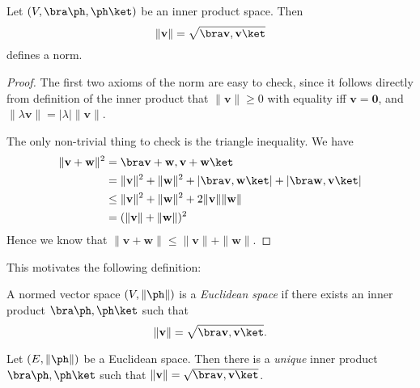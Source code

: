 \documentclass[a4paper]{article}
\begin{document}
\begin{prop}
  Let $(V, \bra \ph, \ph\ket)$ be an inner product space. Then
  \[
    \|\mathbf{v}\| = \sqrt{\bra \mathbf{v}, \mathbf{v}\ket}
  \]
  defines a norm.
\end{prop}

\begin{proof}
  The first two axioms of the norm are easy to check, since it follows directly from definition of the inner product that $\|\mathbf{v}\| \geq 0$ with equality iff $\mathbf{v} = \mathbf{0}$, and $\|\lambda \mathbf{v}\| = |\lambda| \|\mathbf{v}\|$.

  The only non-trivial thing to check is the triangle inequality. We have
  \begin{align*}
    \|\mathbf{v} + \mathbf{w}\|^2 &= \bra \mathbf{v} + \mathbf{w}, \mathbf{v} + \mathbf{w}\ket\\
    &= \|\mathbf{v}\|^2 + \|\mathbf{w}\|^2 + |\bra \mathbf{v}, \mathbf{w}\ket| + |\bra \mathbf{w}, \mathbf{v}\ket|\\
    &\leq \|\mathbf{v}\|^2 + \|\mathbf{w}\|^2 + 2\|\mathbf{v}\|\|\mathbf{w}\| \\
    &= (\|\mathbf{v}\| + \|\mathbf{w}\|)^2
  \end{align*}
  Hence we know that $\|\mathbf{v} + \mathbf{w}\| \leq \|\mathbf{v} \| + \|\mathbf{w}\|$.
\end{proof}

This motivates the following definition:
\begin{defi}
  A normed vector space $(V, \|\ph\|)$ is a \emph{Euclidean space} if there exists an inner product $\bra \ph,\ph\ket$ such that
  \[
    \|\mathbf{v}\| = \sqrt{\bra \mathbf{v}, \mathbf{v}\ket}.
  \]
\end{defi}

\begin{prop}
  Let $(E, \|\ph\|)$ be a Euclidean space. Then there is a \emph{unique} inner product $\bra \ph,\ph\ket$ such that $\|\mathbf{v}\| = \sqrt{\bra \mathbf{v}, \mathbf{v}\ket}$.
\end{prop}
\end{document}
